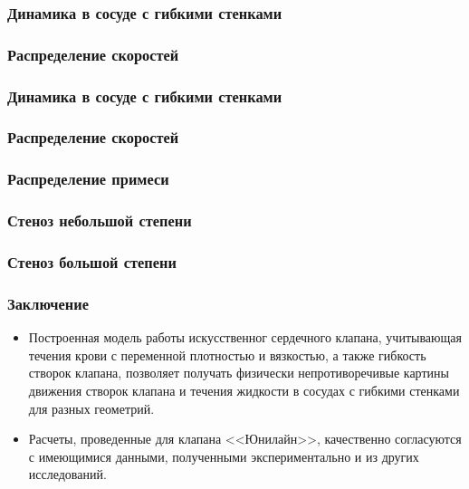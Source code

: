 \documentclass[14pt]{beamer}
\begin{document}
\begin{frame}
\frametitle{Динамика в сосуде с гибкими стенками}
\end{frame}

\begin{frame}
\frametitle{Распределение скоростей}
\end{frame}

\begin{frame}
\frametitle{Динамика в сосуде с гибкими стенками}
\end{frame}

\begin{frame}
\frametitle{Распределение скоростей}
\end{frame}

\begin{frame}
\frametitle{Распределение примеси}
\end{frame}

\begin{frame}
\frametitle{Стеноз небольшой степени}
\end{frame}

\begin{frame}
\frametitle{Стеноз большой степени}
\end{frame}

\begin{frame}
\frametitle{Заключение}
    \begin{itemize}
        \item[\MVRightarrow] Построенная модель работы искусственног сердечного
            клапана, учитывающая течения крови с переменной плотностью и
            вязкостью, а также гибкость створок клапана, позволяет получать физически непротиворечивые картины движения створок клапана и течения жидкости в сосудах с гибкими стенками для разных геометрий.
        \item[\MVRightarrow] Расчеты, проведенные для клапана <<Юнилайн>>,
            качественно согласуются с имеющимися данными, полученными
            экспериментально и из других исследований.
    \end{itemize}
\end{frame}
\end{document}
